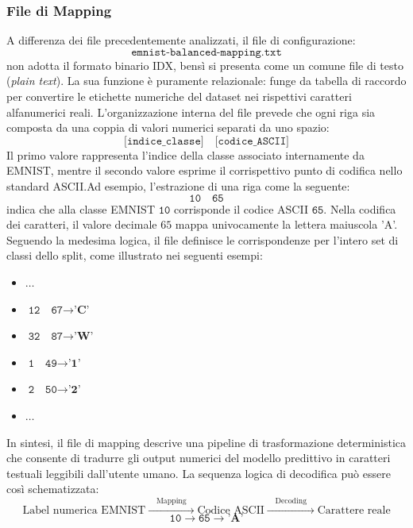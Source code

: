 \documentclass[12pt,a4paper]{article}
\begin{document}
	\subsubsection{File di Mapping}
	A differenza dei file precedentemente analizzati, il file di configurazione:
	$$\texttt{emnist-balanced-mapping.txt}$$
	non adotta il formato binario IDX, bensì si presenta come un comune file di testo (\textit{plain text}). La sua funzione è puramente relazionale: funge da tabella di raccordo per convertire le etichette numeriche del dataset nei rispettivi caratteri alfanumerici reali. L'organizzazione interna del file prevede che ogni riga sia composta da una coppia di valori numerici separati da uno spazio:
	$$\texttt{[indice\_classe]} \quad \texttt{[codice\_ASCII]}$$
	Il primo valore rappresenta l'indice della classe associato internamente da EMNIST, mentre il secondo valore esprime il corrispettivo punto di codifica nello standard ASCII.Ad esempio, l'estrazione di una riga come la seguente:
	$$\texttt{10} \quad \texttt{65}$$
	indica che alla classe EMNIST $\texttt{10}$ corrisponde il codice ASCII $\texttt{65}$. Nella codifica dei caratteri, il valore decimale $65$ mappa univocamente la lettera maiuscola 'A'. Seguendo la medesima logica, il file definisce le corrispondenze per l'intero set di classi dello split, come illustrato nei seguenti esempi:
	\begin{itemize}
		\item $\dots$
		\item $\texttt{12} \quad \texttt{67} \longrightarrow \textbf{'C'}$
		\item $\texttt{32} \quad \texttt{87} \longrightarrow \textbf{'W'}$
		\item $\texttt{1} \quad \texttt{49} \longrightarrow \textbf{'1'}$
		\item $\texttt{2} \quad \texttt{50} \longrightarrow \textbf{'2'}$
		\item $\dots$
	\end{itemize}

	In sintesi, il file di mapping descrive una pipeline di trasformazione deterministica che consente di tradurre gli output numerici del modello predittivo in caratteri testuali leggibili dall'utente umano. La sequenza logica di decodifica può essere così schematizzata:
	$$\text{Label numerica EMNIST} \xrightarrow{\quad \text{Mapping} \quad} \text{Codice ASCII} \xrightarrow{\quad \text{Decoding} \quad} \text{Carattere reale}$$$$\texttt{10} \longrightarrow \texttt{65} \longrightarrow \textbf{'A'}$$
\end{document}
